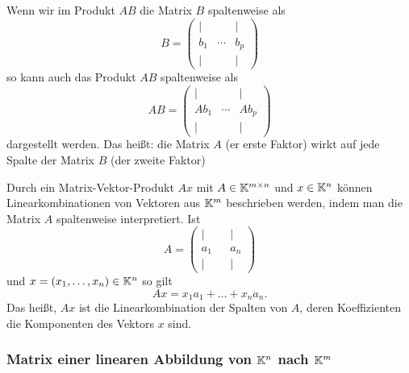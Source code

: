 \begin{bem}
	Wenn wir im Produkt $A B$ die Matrix $B$ spaltenweise als 
	\[
		B = \begin{pmatrix} 
			| & & | 
			\\ b_1 & \cdots & b_p
			\\ | & & | 
		\end{pmatrix} 
	\]
	so kann auch das Produkt $AB$ spaltenweise als 
	\[
		AB =
		\begin{pmatrix} 
		| & & | 
		\\ A b_1 & \cdots & A b_p
		\\ | & & | 
		\end{pmatrix}
	\]
	dargestellt werden. Das heißt: die Matrix $A$ (er erste Faktor) wirkt auf jede Spalte der  Matrix $B$ (der zweite Faktor)
\end{bem}

\begin{bem}
	Durch ein Matrix-Vektor-Produkt $A x$ mit $A \in \mathbb K^{m \times n}$ und $x \in \mathbb K^n$ können Linearkombinationen von Vektoren aus $\mathbb K^m$ beschrieben werden, indem man die Matrix $A$ spaltenweise interpretiert. Ist 
	\[
		A = \begin{pmatrix} 
			| & & |
	\\		a_1 & & a_n 
	\\	| & & |
		\end{pmatrix} 
	\]
	und $x=(x_1,\ldots,x_n) \in \mathbb K^n$ so gilt 
	\[ 
		Ax = x_1a_1 + \ldots + x_na_n.
	\]
	Das heißt, $A x$ ist die Linearkombination der Spalten von $A$, deren Koeffizienten die Komponenten des Vektors $x$ sind. 
\end{bem}

\subsubsection{Matrix einer linearen Abbildung von $ \mathbb K^n $ nach $ \mathbb K^m $}

